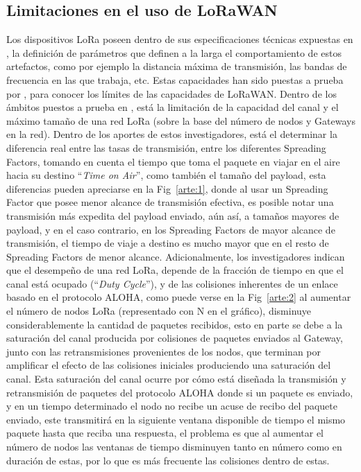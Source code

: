 \begin{justify}
\subsection{Limitaciones en el uso de LoRaWAN}
Los dispositivos LoRa poseen dentro de sus especificaciones técnicas expuestas en \cite{orange}, la definición de parámetros que definen a la larga el comportamiento de estos artefactos, como por ejemplo la distancia máxima de transmisión, las bandas de frecuencia en las que trabaja, etc. Estas capacidades han sido puestas a prueba por \cite{Xavier}, para conocer los límites de las capacidades de LoRaWAN. Dentro de los ámbitos puestos a prueba en \cite{Xavier}, está la limitación de la capacidad del canal y el máximo tamaño de una red LoRa (sobre la base del número de nodos y Gateways en la red). Dentro de los aportes de estos investigadores, está el determinar la diferencia real entre las tasas de transmisión, entre los diferentes Spreading Factors, tomando en cuenta el tiempo que toma el paquete en viajar en el aire hacia su destino ``\textit{Time on Air}'', como también el tamaño del payload, esta diferencias pueden apreciarse en la Fig~\ref{arte:1}, donde al usar un Spreading Factor que posee menor alcance de transmisión efectiva, es posible notar una transmisión más expedita del payload enviado, aún así, a tamaños mayores de payload, y en el caso contrario, en los Spreading Factors de mayor alcance de transmisión, el tiempo de viaje a destino es mucho mayor que en el resto de Spreading Factors de menor alcance. Adicionalmente, los investigadores indican que el desempeño de una red LoRa, depende de la fracción de tiempo en que el canal está ocupado (``\textit{Duty Cycle}''), y de las colisiones inherentes de un enlace basado en el protocolo ALOHA, como puede verse en la Fig~\ref{arte:2} al aumentar el número de nodos LoRa (representado con N en el gráfico), disminuye considerablemente la cantidad de paquetes recibidos, esto en parte se debe a la saturación del canal producida por colisiones de paquetes enviados al Gateway, junto con las retransmisiones provenientes de los nodos, que terminan por amplificar el efecto de las colisiones iniciales produciendo una saturación del canal. Esta saturación del canal ocurre por cómo está diseñada la transmisión y retransmisión de paquetes del protocolo ALOHA\cite{NORMAN} donde si un paquete es enviado, y en un tiempo determinado el nodo no recibe un acuse de recibo del paquete enviado, este transmitirá en la siguiente ventana disponible de tiempo el mismo paquete hasta que reciba una respuesta, el problema es que al aumentar el número de nodos las ventanas de tiempo disminuyen tanto en número como en duración de estas, por lo que es más frecuente las colisiones dentro de estas.\\

\end{justify}

